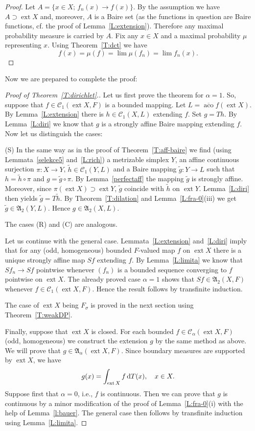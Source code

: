 \documentclass{amsart}
\numberwithin{equation}{section}
\theoremstyle{definition}
\def\fra{\mathfrak{A}}
\def\C{\mathcal C}
\def\aco{\operatorname{aco}}
\def\ov{\overline}
\def \ext {\operatorname{ext}}
\def\di{\,\mbox{\rm d}}
\newcommand{\setsep}{;\,}
\begin{document}
\begin{proof} Let $A=\{x\in X\setsep f_n(x)\to f(x)\}$. By the assumption we have $A\supset \ext X$ and, moreover, $A$ is a Baire set (as the functions in question are Baire functions, cf. the proof of Lemma~\ref{L:extension}). Therefore any maximal probability measure is carried by $A$. Fix any $x\in X$ and a maximal probability $\mu$ representing $x$. Using Theorem~\ref{T:dct} we have
$$f(x)=\mu(f)=\lim\mu(f_n)=\lim f_n(x).$$
\end{proof}


Now we are prepared to complete the proof:


\begin{proof}[Proof of Theorem~\ref{T:dirichlet}.] Let us first prove the theorem for $\alpha=1$.
So, suppose that $f\in\C_1(\ext X,F)$ is a bounded mapping. Let $L=\ov{\aco} f(\ext X)$. By Lemma~\ref{L:extension}
there is $h\in\C_1(X,L)$ extending $f$. Set $g=Th$. By Lemma~\ref{L:diri} we know that $g$ is a strongly affine Baire mapping extending $f$. Now let us distinguish the cases:

(S) In the same way as in the proof of Theorem~\ref{T:aff-baire} we find (using Lemmata~\ref{selekce5} and~\ref{L:rich}) 
a metrizable simplex $Y$, an affine continuous surjection $\pi\colon X\to Y$, $\tilde h\in\C_1(Y,L)$ and a Baire mapping $\tilde g\colon Y\to L$ such that $h=\tilde h\circ \pi$ and $g=\tilde g\circ \pi$. By Lemma~\ref{perfectaff} the mapping $\tilde g$ is strongly affine. Moreover, since $\pi(\ext X)\supset\ext Y$, $\tilde g$ coincide with $\tilde h$ on $\ext Y$.
Lemma~\ref{L:diri} then yields  $\tilde g= T\tilde h$. By Theorem~\ref{T:dilation} and Lemma~\ref{L:fra-0}(iii) we get $\tilde g\in\fra_2(Y,L)$. Hence $g\in\fra_2(X,L)$.

The cases (R) and (C) are analogous.


Let us continue with the general case. Lemmata~\ref{L:extension} and~\ref{L:diri} imply that for any (odd, homogeneous) bounded $F$-valued map $f$ on $\ext X$ there is a unique strongly affine map $Sf$ extending $f$. By Lemma~\ref{L:limita} we know that $Sf_n\to Sf$ pointwise whenever $(f_n)$ is a bounded sequence converging to $f$ pointwise on $\ext X$. The already proved case
$\alpha=1$ shows that $Sf\in\fra_2(X,F)$ whenever $f\in\C_1(\ext X,F)$. Hence the result follows by transfinite induction.

\medskip

The case of $\ext X$ being $F_\sigma$ is proved in the next section using Theorem~\ref{T:weakDP}.

\medskip

Finally, suppose that $\ext X$ is closed. For each bounded $f\in\C_\alpha(\ext X,F)$  (odd, homogeneous) we construct the extension $g$ by the same method as above. We will prove that $g\in\fra_\alpha(\ext X,F)$. Since boundary measures are supported by $\ext X$, we have
$$g(x)=\int_{\ext X} f\di T(x),\quad x\in X.$$
Suppose first that $\alpha=0$, i.e., $f$ is continuous. Then we can prove that $g$ is continuous by a minor modification of the proof of Lemma~\ref{L:fra-0}(i) with the help of Lemma~\ref{l:bauer}. The general case then follows by transfinite induction using Lemma~\ref{L:limita}.
\end{proof}
\end{document}
